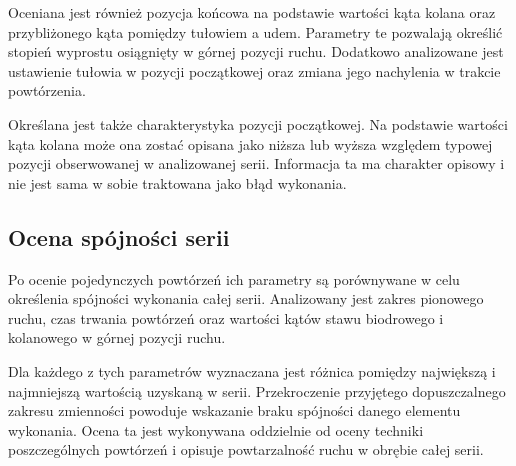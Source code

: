 Oceniana jest również pozycja końcowa na podstawie wartości kąta kolana oraz przybliżonego kąta pomiędzy tułowiem a udem. Parametry te pozwalają określić stopień wyprostu osiągnięty w górnej pozycji ruchu. Dodatkowo analizowane jest ustawienie tułowia w pozycji początkowej oraz zmiana jego nachylenia w trakcie powtórzenia.

Określana jest także charakterystyka pozycji początkowej. Na podstawie wartości kąta kolana może ona zostać opisana jako niższa lub wyższa względem typowej pozycji obserwowanej w analizowanej serii. Informacja ta ma charakter opisowy i nie jest sama w sobie traktowana jako błąd wykonania.

\subsection{Ocena spójności serii}

Po ocenie pojedynczych powtórzeń ich parametry są porównywane w celu określenia spójności wykonania całej serii. Analizowany jest zakres pionowego ruchu, czas trwania powtórzeń oraz wartości kątów stawu biodrowego i kolanowego w górnej pozycji ruchu.

Dla każdego z tych parametrów wyznaczana jest różnica pomiędzy największą i najmniejszą wartością uzyskaną w serii. Przekroczenie przyjętego dopuszczalnego zakresu zmienności powoduje wskazanie braku spójności danego elementu wykonania. Ocena ta jest wykonywana oddzielnie od oceny techniki poszczególnych powtórzeń i opisuje powtarzalność ruchu w obrębie całej serii.
